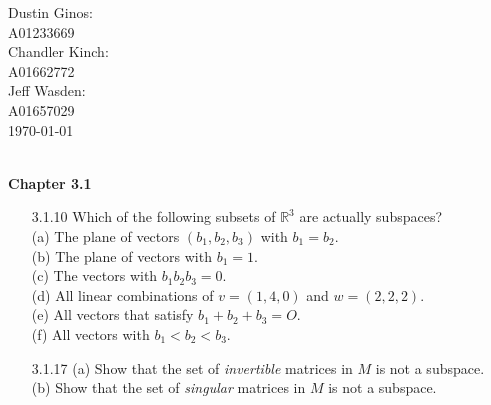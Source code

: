 \documentclass[10pt,twoside,reqno]{article}
\begin{document}
\begin{flushright}
\begin{minipage}{.25\textwidth}
Dustin Ginos: \\
A01233669\\
Chandler Kinch: \\
A01662772\\
Jeff Wasden: \\
A01657029\\

\today
\end{minipage}
\end{flushright}

\\
\vspace{5mm}
\textbf{Chapter 3.1}
\begin{enumerate}
\item[3.1.10] Which of the following subsets of ${\mathbb R}^3$ are actually subspaces? \\ \vspace{1mm}
{\addtolength{\leftskip}{5mm}
(a) The plane of vectors $(b_1, b_2 , b_3)$ with $b_1 = b_2$. \\ \vspace{1mm}
(b) The plane of vectors with $b_1 = 1$. \\ \vspace{1mm}
(c) The vectors with $b_1b_2b_3 = 0$. \\ \vspace{1mm}
(d) All linear combinations of $v = (1,4,0)$ and $w = (2,2,2)$. \\ \vspace{1mm}
(e) All vectors that satisfy $b_1 + b_2 + b_3 = O$. \\ \vspace{1mm}
(f) All vectors with $b_1 < b_2 < b_3$.  \\
}
\vspace{3mm}



\item[3.1.17] \hspace{5mm}(a) Show that the set of \textit{invertible} matrices in $M$ is not a subspace. \\ \vspace{1mm}
\hspace{5mm}(b) Show that the set of \textit{singular} matrices in $M$ is not a subspace.\\
\vspace{3mm}




\end{enumerate}
\end{document}
